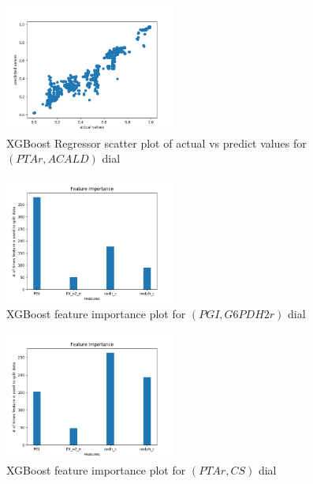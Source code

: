 \documentclass[12pt,chapterheads]{ucsd}
\begin{document}
\begin{figure}[h] 
\centering
\includegraphics[width=0.5\textwidth]{Figures/PTAr_ACALD_xgboost_no_params}
\caption[XGBoost Regressor scatter plot of actual vs predict values for $(PTAr, ACALD)$ dial]
{XGBoost Regressor scatter plot of actual vs predict values for $(PTAr, ACALD)$ dial}
\label{fig:PtarAcaldXgb}
\end{figure}

\begin{figure}[h] 
\centering
\includegraphics[width=0.5\textwidth]{Figures/PGI_G6PDH2r_xgboost_no_params_important_features}
\caption[XGBoost feature importance plot for $(PGI, G6PDH2r)$ dial]
{XGBoost feature importance plot for $(PGI, G6PDH2r)$ dial}
\label{fig:PgiG6pdh2rXgbImp}
\end{figure}

\begin{figure}[h] 
\centering
\includegraphics[width=0.5\textwidth]{Figures/PTAr_CS_xgboost_no_params_important_features}
\caption[XGBoost feature importance plot for $(PTAr, CS)$ dial]
{XGBoost feature importance plot for $(PTAr, CS)$ dial}
\label{fig:PtarCsXgbImp}
\end{figure}
\end{document}
